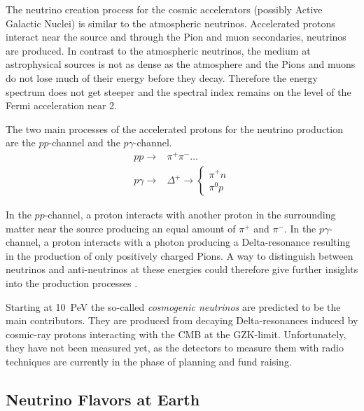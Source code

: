 The neutrino creation process for the cosmic accelerators (possibly Active Galactic Nuclei) is similar to the atmospheric neutrinos.
Accelerated protons interact near the source and through the Pion and muon secondaries, neutrinos are produced.
In contrast to the atmospheric neutrinos, the medium at astrophysical sources is not as dense as the atmosphere and the Pions and muons do not lose much of their energy before they decay.
Therefore the energy spectrum does not get steeper and the spectral index remains on the level of the Fermi acceleration near 2.

The two main processes of the accelerated protons for the neutrino production are the $pp$-channel and the $p\gamma$-channel.
\begin{align}
    p p \to & \pi^+ \pi^- \dots \\
    p \gamma \to & \Delta^+ \to \begin{cases} \pi^+ n \\ \pi^0 p \end{cases}
\end{align}

In the $pp$-channel, a proton interacts with another proton in the surrounding matter near the source producing an equal amount of $\pi^+$ and $\pi^-$.
In the $p\gamma$-channel, a proton interacts with a photon producing a Delta-resonance resulting in the production of only positively charged Pions.
A way to distinguish between neutrinos and anti-neutrinos at these energies could therefore give further insights into the production processes \cite{Biehl17}.

Starting at \SI{10}{PeV} the so-called \textit{cosmogenic neutrinos} are predicted to be the main contributors.
They are produced from decaying Delta-resonances induced by cosmic-ray protons interacting with the CMB at the GZK-limit.
Unfortunately, they have not been measured yet, as the detectors to measure them with radio techniques are currently in the phase of planning and fund raising.

\subsection{Neutrino Flavors at Earth} \label{sec:nu_osc}

